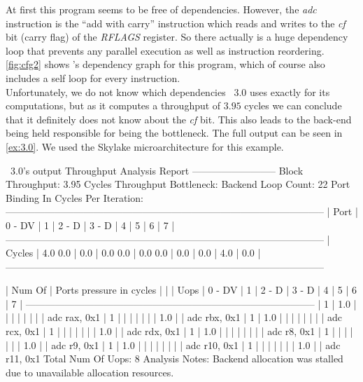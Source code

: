 \FloatBarrier

At first this program seems to be free of dependencies. However, the \emph{adc} instruction is the ``add with carry'' instruction which reads and writes to the \emph{cf} bit (carry flag) of the \emph{RFLAGS} register. So there actually is a huge dependency loop that prevents any parallel execution as well as instruction reordering. \autoref{fig:cfg2} shows \suaca's dependency graph for this program, which of course also includes a self loop for every instruction.\\
Unfortunately, we do not know which dependencies \iaca\ $3.0$ uses exactly for its computations, but as it computes a throughput of $3.95$ cycles we can conclude that it definitely does not know about the \emph{cf} bit. This also leads to the back-end being held responsible for being the bottleneck. The full output can be seen in \autoref{ex:3.0}. We used the Skylake microarchitecture for this example. 

\begin{LabeledExample}{\iaca\ $3.0$'s output}{\label{ex:3.0}}
    Throughput Analysis Report
    --------------------------
    Block Throughput: 3.95 Cycles       Throughput Bottleneck: Backend
    Loop Count:  22
    Port Binding In Cycles Per Iteration:
    --------------------------------------------------------------------------------------------------
    |  Port  |   0   -  DV   |   1   |   2   -  D    |   3   -  D    |   4   |   5   |   6   |   7   |
    --------------------------------------------------------------------------------------------------
    | Cycles |  4.0     0.0  |  0.0  |  0.0     0.0  |  0.0     0.0  |  0.0  |  0.0  |  4.0  |  0.0  |
    --------------------------------------------------------------------------------------------------
    
    
    | Num Of   |                    Ports pressure in cycles                         |      |
    |  Uops    |  0  - DV    |  1   |  2  -  D    |  3  -  D    |  4   |  5   |  6   |  7   |
    -----------------------------------------------------------------------------------------
    |   1      | 1.0         |      |             |             |      |      |      |      | adc rax, 0x1
    |   1      |             |      |             |             |      |      | 1.0  |      | adc rbx, 0x1
    |   1      | 1.0         |      |             |             |      |      |      |      | adc rcx, 0x1
    |   1      |             |      |             |             |      |      | 1.0  |      | adc rdx, 0x1
    |   1      | 1.0         |      |             |             |      |      |      |      | adc r8, 0x1
    |   1      |             |      |             |             |      |      | 1.0  |      | adc r9, 0x1
    |   1      | 1.0         |      |             |             |      |      |      |      | adc r10, 0x1
    |   1      |             |      |             |             |      |      | 1.0  |      | adc r11, 0x1
    Total Num Of Uops: 8
    Analysis Notes:
    Backend allocation was stalled due to unavailable allocation resources.
\end{LabeledExample}

